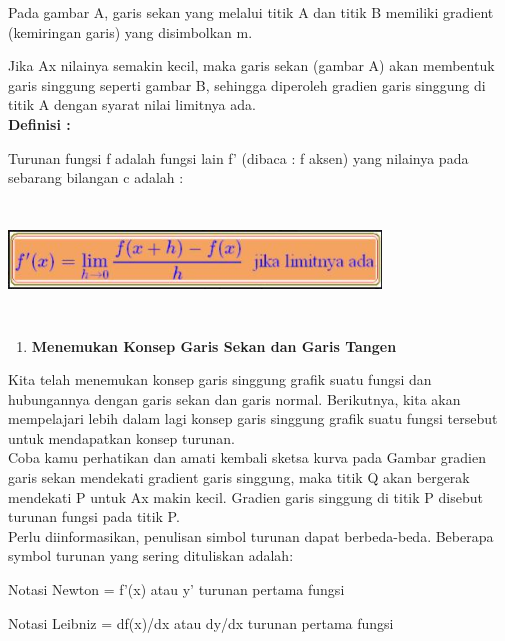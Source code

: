 \documentclass[11pt,fleqn]{book} %
\begin{document}
\noindent 
Pada gambar A, garis sekan yang melalui titik A dan titik B memiliki gradient (kemiringan garis) yang disimbolkan m.

\noindent 
Jika Ax nilainya semakin kecil, maka garis sekan (gambar A) akan membentuk garis singgung seperti gambar B, sehingga diperoleh gradien garis singgung di titik A dengan syarat nilai limitnya ada.\\


\noindent 
\textbf{Definisi :}

\noindent 
Turunan fungsi f adalah fungsi lain f’ (dibaca : f aksen)  yang nilainya pada sebarang bilangan c adalah :

\noindent 
\begin{center}
\noindent \includegraphics*[width=3.90in, height=1.21in, keepaspectratio=false, trim=0.00in 0.11in 0.00in 0.00in]{Pictures/TurunanFungsi5.JPG}
\end{center}

\noindent 
\begin{enumerate}
\item \textbf{Menemukan Konsep Garis Sekan dan Garis Tangen}
\end{enumerate}

\noindent 
Kita telah menemukan konsep garis singgung grafik suatu fungsi dan hubungannya dengan garis sekan dan garis normal. Berikutnya, kita akan mempelajari lebih dalam lagi konsep garis singgung grafik suatu fungsi tersebut untuk mendapatkan konsep turunan.\\

\noindent 
Coba kamu perhatikan dan amati kembali sketsa kurva pada Gambar gradien garis sekan mendekati gradient garis singgung, maka titik Q akan bergerak mendekati P untuk Ax makin kecil. Gradien garis singgung di titik P disebut turunan fungsi pada titik P.\\

\noindent 
Perlu diinformasikan, penulisan simbol turunan dapat berbeda-beda. Beberapa symbol turunan yang sering dituliskan adalah:

\noindent 
Notasi Newton = f'(x)  atau  y'  turunan pertama fungsi

\noindent 
Notasi Leibniz = df(x)/dx  atau  dy/dx  turunan pertama fungsi\\
\end{document}
